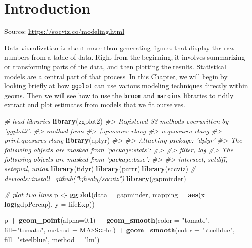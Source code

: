 \documentclass[]{book}
\newenvironment{Shaded}{\begin{snugshade}}{\end{snugshade}}
\newcommand{\CommentTok}[1]{\textcolor[rgb]{0.56,0.35,0.01}{\textit{#1}}}
\newcommand{\DataTypeTok}[1]{\textcolor[rgb]{0.13,0.29,0.53}{#1}}
\newcommand{\FloatTok}[1]{\textcolor[rgb]{0.00,0.00,0.81}{#1}}
\newcommand{\KeywordTok}[1]{\textcolor[rgb]{0.13,0.29,0.53}{\textbf{#1}}}
\newcommand{\NormalTok}[1]{#1}
\newcommand{\OperatorTok}[1]{\textcolor[rgb]{0.81,0.36,0.00}{\textbf{#1}}}
\newcommand{\StringTok}[1]{\textcolor[rgb]{0.31,0.60,0.02}{#1}}
\begin{document}
\hypertarget{introduction-1}{%
\section{Introduction}\label{introduction-1}}

Source: \url{https://socviz.co/modeling.html}

Data visualization is about more than generating figures that display the raw numbers from a table of data. Right from the beginning, it involves summarizing or transforming parts of the data, and then plotting the results. Statistical models are a central part of that process. In this Chapter, we will begin by looking briefly at how \texttt{ggplot} can use various modeling techniques directly within geoms. Then we will see how to use the \texttt{broom} and \texttt{margins} libraries to tidily extract and plot estimates from models that we fit ourselves.\\

\begin{Shaded}
\begin{Highlighting}[]
\CommentTok{# load libraries}
\KeywordTok{library}\NormalTok{(ggplot2)}
\CommentTok{#> Registered S3 methods overwritten by 'ggplot2':}
\CommentTok{#>   method         from }
\CommentTok{#>   [.quosures     rlang}
\CommentTok{#>   c.quosures     rlang}
\CommentTok{#>   print.quosures rlang}
\KeywordTok{library}\NormalTok{(dplyr)}
\CommentTok{#> }
\CommentTok{#> Attaching package: 'dplyr'}
\CommentTok{#> The following objects are masked from 'package:stats':}
\CommentTok{#> }
\CommentTok{#>     filter, lag}
\CommentTok{#> The following objects are masked from 'package:base':}
\CommentTok{#> }
\CommentTok{#>     intersect, setdiff, setequal, union}
\KeywordTok{library}\NormalTok{(tidyr)}
\KeywordTok{library}\NormalTok{(purrr)}
\KeywordTok{library}\NormalTok{(socviz)       }\CommentTok{# devtools::install_github("kjhealy/socviz")}
\KeywordTok{library}\NormalTok{(gapminder)}
\end{Highlighting}
\end{Shaded}

\begin{Shaded}
\begin{Highlighting}[]
\CommentTok{# plot two lines}
\NormalTok{p <-}\StringTok{ }\KeywordTok{ggplot}\NormalTok{(}\DataTypeTok{data =}\NormalTok{ gapminder,}
            \DataTypeTok{mapping =} \KeywordTok{aes}\NormalTok{(}\DataTypeTok{x =} \KeywordTok{log}\NormalTok{(gdpPercap), }\DataTypeTok{y =}\NormalTok{ lifeExp))}

\NormalTok{p }\OperatorTok{+}\StringTok{ }\KeywordTok{geom_point}\NormalTok{(}\DataTypeTok{alpha=}\FloatTok{0.1}\NormalTok{) }\OperatorTok{+}
\StringTok{    }\KeywordTok{geom_smooth}\NormalTok{(}\DataTypeTok{color =} \StringTok{"tomato"}\NormalTok{, }\DataTypeTok{fill=}\StringTok{"tomato"}\NormalTok{, }\DataTypeTok{method =}\NormalTok{ MASS}\OperatorTok{::}\NormalTok{rlm) }\OperatorTok{+}
\StringTok{    }\KeywordTok{geom_smooth}\NormalTok{(}\DataTypeTok{color =} \StringTok{"steelblue"}\NormalTok{, }\DataTypeTok{fill=}\StringTok{"steelblue"}\NormalTok{, }\DataTypeTok{method =} \StringTok{"lm"}\NormalTok{)}
\end{Highlighting}
\end{Shaded}
\end{document}
